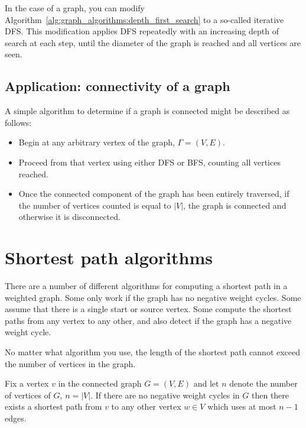 In the case of a graph, you can modify
Algorithm~\ref{alg:graph_algorithms:depth_first_search} to a so-called
iterative DFS. This modification applies DFS repeatedly with an
increasing depth of search at each step, until the diameter of the
graph is reached and all vertices are seen.

\subsection{Application: connectivity of a graph}


A simple algorithm to determine if a graph is connected 
might be described as follows:
\begin{itemize}

\item
Begin at any arbitrary vertex of the graph, $\Gamma=(V,E)$.

\item
Proceed from that vertex using either DFS or BFS, counting all
vertices reached.

\item
Once the connected component of the graph has been entirely traversed, 
if the number of vertices counted is equal to $|V|$, 
the graph is connected and otherwise it is disconnected.
\end{itemize}



\section{Shortest path algorithms}

There are a number of different algorithms for computing a shortest
path in a weighted graph. Some only work if the graph has
no negative weight cycles. Some assume that there is a single 
start or source vertex. Some compute the shortest paths from
any vertex to any other, and also detect if the graph has
a negative weight cycle.

No matter what algorithm you use, the length of the shortest path 
cannot exceed the number of vertices in the graph.

\begin{lemma}
{\rm
Fix a vertex $v$ in the connected graph $G=(V,E)$ and let $n$ denote the
number of vertices of $G$, $n=|V|$.
If there are no negative weight cycles in $G$ then there 
exists a shortest path from $v$ 
to any other vertex $w\in V$ which uses at most $n-1$ edges.
}
\end{lemma}

